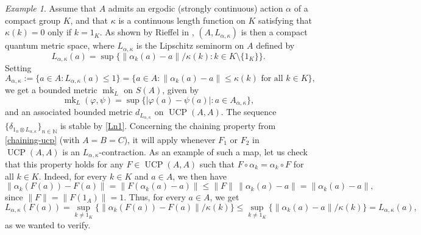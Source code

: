 \documentclass[11pt, a4paper, oneside, final, reqno]{amsart}
\newcommand{\bbN}{\mathbb{N}}
\newcommand{\UCP}{\operatorname{UCP}}
\newcommand{\mk}{\operatorname{mk}}
\theoremstyle{definition}
\theoremstyle{plain}
\theoremstyle{remark}
\newtheorem{example}[definition]{Example}
\numberwithin{equation}{section}
\begin{document}
\begin{example}\label{ergodic}
    Assume that $A$ admits an ergodic (strongly continuous) action $\alpha$ of a compact group $K$, and that $\kappa$ is a continuous length function on $K$ satisfying that $\kappa(k) = 0$ only if $k = 1_K$.  As shown by Rieffel in \cite[Theorem 2.3]{Rieffel98}, $(A, L_{\alpha, \kappa})$ is then a compact quantum metric space, where $L_{\alpha, \kappa}$ is the Lipschitz seminorm on $A$ defined by
    \begin{equation*}
        L_{\alpha, \kappa}(a) = \sup\big\{{\|\alpha_k(a) -a\|}/{\kappa(k)} : k \in K\setminus\{1_K\}\big\}.
    \end{equation*}
    Setting
    \begin{equation*}
        A_{\alpha, \kappa} := \{ a \in A : L_{\alpha, \kappa}(a) \leq 1 \} = \{ a \in A : \|\alpha_k(a) - a\| \leq \kappa(k) \text{ for all } k \in K \},
    \end{equation*}
    we get a bounded metric $\mk_L$ on $S(A)$, given by
    \begin{equation*}
        \mk_L(\varphi, \psi) = \sup\{ |\varphi(a) -\psi(a)| : a \in A_{\alpha, \kappa}\},
    \end{equation*}
    and an associated bounded metric $d_{L_{\alpha, \kappa}}$ on $\UCP(A, A)$. The sequence $\{\delta_{1_n\otimes L_{\alpha, \kappa}}\}_{n\in \bbN}$ is stable by \cref{Ln1}. Concerning the chaining property from \cref{chaining-ucp} (with $A=B=C$), it will apply whenever $F_1$ or  $F_2$ in $\UCP(A, A)$ is an $L_{\alpha, \kappa}$-contraction. As an example of such a map, let us check that this property holds for any $F\in \UCP(A, A)$ such that $F\circ \alpha_k = \alpha_k \circ F$ for all $k\in K$. Indeed, for every $k\in K$ and $a \in A$, we then have
    \begin{equation*}
        \|\alpha_k(F(a)) -F(a)\| = \|F(\alpha_k(a) -a)\| \leq \|F\| \, \|\alpha_k(a) -a\| =  \|\alpha_k(a) -a\|,
    \end{equation*}
    since $\|F\| = \|F(1_A)\| = 1$. Thus, for every $a\in A$, we get
    \begin{equation*}
        L_{\alpha, \kappa}(F(a)) = \sup_{k \neq 1_K} \big\{{\|\alpha_k(F(a)) -F(a)\|}/{\kappa(k)}\big\} \leq  \sup_{k \neq 1_K} \big\{{\|\alpha_k(a) -a\|}/{\kappa(k)}\big\} = L_{\alpha, \kappa}(a),
    \end{equation*}
    as we wanted to verify.


\end{example}
\end{document}
